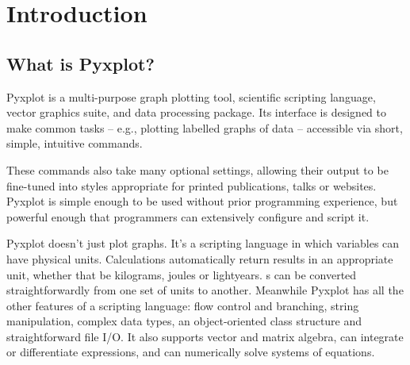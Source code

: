 %
%
%
%
%



\chapter{Introduction}

\label{ch:introduction}

\section{What is Pyxplot?}

Pyxplot is a multi-purpose graph plotting tool, scientific scripting language,
vector graphics suite, and data processing package.  Its interface is designed
to make common tasks -- e.g., plotting labelled graphs of data -- accessible
via short, simple, intuitive commands.

These commands also take many optional settings, allowing their output to be
fine-tuned into styles appropriate for printed publications, talks or websites.
Pyxplot is simple enough to be used without prior programming experience, but
powerful enough that programmers can extensively configure and script it.


Pyxplot doesn't just plot graphs. It's a scripting language in which variables
can have physical units. Calculations automatically return results in an
appropriate unit, whether that be kilograms, joules or lightyears.  \Datafile s
can be converted straightforwardly from one set of units to another. Meanwhile
Pyxplot has all the other features of a scripting language: flow control and
branching, string manipulation, complex data types, an object-oriented class
structure and straightforward file I/O.  It also supports vector and matrix
algebra, can integrate or differentiate expressions, and can numerically solve
systems of equations.

